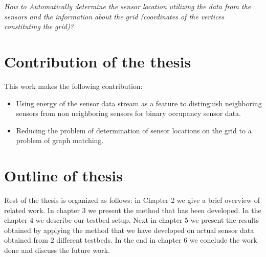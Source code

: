 \textit{How to Automatically determine the sensor location utilizing the data from the sensors and the information about the grid (coordinates of the vertices constituting the grid)?}

\section{Contribution of the thesis}
This work makes the following contribution:
\begin{itemize}
\item Using energy of the sensor data stream as a feature to distinguish neighboring sensors from non neighboring sensors for binary occupancy sensor data.
\item Reducing the problem of determination of sensor locations  on the grid to a problem of graph matching.
\end{itemize}

\section{Outline of thesis}

Rest of the thesis is organized as follows: in Chapter 2 we give a brief overview of related work. In chapter 3 we present the method that has been developed. In the chapter 4 we describe our testbed setup. Next in chapter 5 we present the results obtained by applying the method that we have developed on actual sensor data obtained from 2 different testbeds. In the end in chapter 6 we conclude the work done and discuss the future work.






\vspace{1\baselineskip}

\noindent

